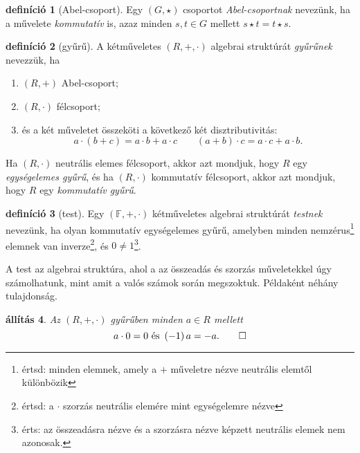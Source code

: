 \documentclass[9pt, a4paper, showtrims]{memoir}
\theoremstyle{plain}
\newtheorem{proposition}{állítás}[chapter]
\theoremstyle{remark}
\theoremstyle{definition}
\newtheorem{definition}[proposition]{definíció}
\begin{document}
\begin{definition}[Abel-csoport]
    Egy $\left( G,\star \right)$ csoportot \emph{Abel-csoportnak} nevezünk,
    ha a művelete \emph{kommutatív} is, 
    azaz minden $s,t\in G$ mellett $s\star t=t\star s$.
\end{definition}
\begin{definition}[gyűrű]
    A kétműveletes $\left( R,+,\cdot \right)$ algebrai struktúrát \emph{gyűrűnek} nevezzük,
    ha
    \begin{enumerate}
        \item $\left( R,+ \right)$ Abel-csoport;
        \item $\left( R,\cdot \right)$ félcsoport;
        \item és a két műveletet összeköti a következő két disztributivitás:
            \[
                a\cdot\left( b+c \right)=a\cdot b + a\cdot c\qquad
                \left( a + b \right)\cdot c=a\cdot c+a\cdot b.
            \]
    \end{enumerate}
    Ha $\left( R,\cdot \right)$ neutrális elemes félcsoport, akkor azt mondjuk, hogy $R$ egy
    \emph{egységelemes gyűrű}, és ha $\left( R,\cdot \right)$ kommutatív félcsoport, akkor
    azt mondjuk, hogy $R$ egy \emph{kommutatív gyűrű}.
\end{definition}
\begin{definition}[test]
    Egy $\left( \mathbb{F},+,\cdot \right)$ kétműveletes algebrai struktúrát \emph{testnek}
    nevezünk, 
    ha olyan kommutatív egységelemes gyűrű, 
    amelyben minden nemzérus\footnote{értsd: minden elemnek, amely a $+$ műveletre nézve neutrális elemtől különbözik}
    elemnek van inverze\footnote{értsd: a $\cdot$ szorzás neutrális elemére mint egységelemre nézve}, 
    és $0\neq 1$\footnote{érts: az összeadásra nézve és a szorzásra nézve képzett neutrális elemek nem azonosak.}.
\end{definition}
A test az algebrai struktúra, ahol a az összeadás és szorzás műveletekkel úgy számolhatunk, mint amit a valós számok során megszoktuk.
Példaként néhány tulajdonság.
\begin{proposition}
    Az $\left( R,+,\cdot \right)$ gyűrűben minden $a\in R$ mellett 
    \begin{equation*}
        a\cdot 0=0\text{ és }
        \left( -1 \right)a=-a.\qedhere
    \end{equation*}
\end{proposition}
\end{document}
